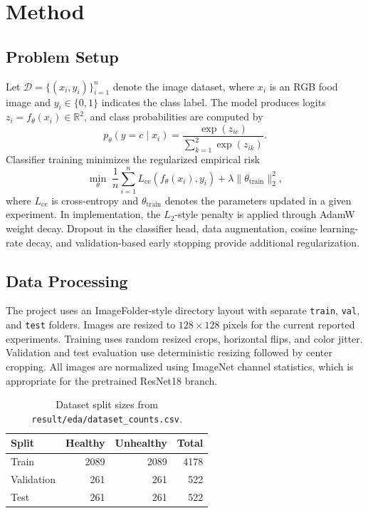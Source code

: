 \section{Method}

\subsection{Problem Setup}

Let \(\mathcal{D}=\{(x_i,y_i)\}_{i=1}^{n}\) denote the image dataset, where \(x_i\) is an RGB food image and \(y_i \in \{0,1\}\) indicates the class label. The model produces logits \(z_i=f_\theta(x_i)\in\mathbb{R}^{2}\), and class probabilities are computed by
\begin{equation}
  p_\theta(y=c\mid x_i)=\frac{\exp(z_{ic})}{\sum_{k=1}^{2}\exp(z_{ik})}.
\end{equation}
Classifier training minimizes the regularized empirical risk
\begin{equation}
  \min_{\theta}\;
  \frac{1}{n}\sum_{i=1}^{n}
  L_{\mathrm{ce}}\!\left(f_\theta(x_i),y_i\right)
  +\lambda\lVert\theta_{\mathrm{train}}\rVert_2^2,
\end{equation}
where \(L_{\mathrm{ce}}\) is cross-entropy and \(\theta_{\mathrm{train}}\) denotes the parameters updated in a given experiment. In implementation, the \(L_2\)-style penalty is applied through AdamW weight decay. Dropout in the classifier head, data augmentation, cosine learning-rate decay, and validation-based early stopping provide additional regularization.

\subsection{Data Processing}

The project uses an ImageFolder-style directory layout with separate \texttt{train}, \texttt{val}, and \texttt{test} folders. Images are resized to \(128\times128\) pixels for the current reported experiments. Training uses random resized crops, horizontal flips, and color jitter. Validation and test evaluation use deterministic resizing followed by center cropping. All images are normalized using ImageNet channel statistics, which is appropriate for the pretrained ResNet18 branch.

\begin{table}[t]
  \centering
  \caption{Dataset split sizes from \texttt{result/eda/dataset\_counts.csv}.}
  \label{tab:dataset}
  \begin{tabular}{lrrr}
    \toprule
    Split & Healthy & Unhealthy & Total \\
    \midrule
    Train & 2089 & 2089 & 4178 \\
    Validation & 261 & 261 & 522 \\
    Test & 261 & 261 & 522 \\
    \bottomrule
  \end{tabular}
\end{table}

